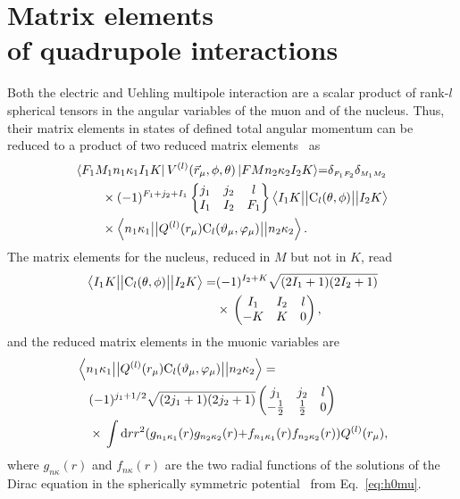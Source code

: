 \section{Matrix elements\\of quadrupole interactions}
\label{sec:mat}
Both the electric and Uehling multipole interaction are a scalar product of rank-$l$ spherical tensors in the angular variables of the muon and of the nucleus. Thus, their matrix elements in states of defined total angular momentum can be reduced to a product of two reduced matrix elements~\cite{varshalovich1988} as
\begin{align}
&{\left< F_1M_1n_1\kappa_1I_1K\right|V^{(l)}(\vec{r}_\mu,\phi,\theta)\left|FMn_2\kappa_2I_2K\right>} {=}
{\delta_{\scriptscriptstyle F_1F_2}\delta_{\scriptscriptstyle M_1M_2}}\notag\\
&\qquad\times(-1)^{F_1+j_2+I_1}
\left\{
\begin{matrix}
j_1&j_2&l\\
I_1&I_2&F_1
\end{matrix}
\right\}\left< I_1K\big{|}\big{|}\text{C}_l(\theta,\phi)\big{|}\big{|}I_2K\right>\notag\\
&\qquad\times \left< n_1\kappa_1\big{|}\big{|}Q^{(l)}(r_\mu)\text{C}_l(\vartheta_\mu,\varphi_\mu) \big{|}\big{|}n_2\kappa_2\right>.\label{eq:matel}
\end{align}
The matrix elements for the nucleus, reduced in $M$ but not in $K$, read~\cite{brown_carrington}
\begin{align}
\left< I_1K\big{|}\big{|}\text{C}_l(\theta,\phi)\big{|}\big{|}I_2K\right>=&(-1)^{I_2+K}
\sqrt{(2I_1+1)(2I_2+1)}\notag\\
&\times\,\left(
\begin{matrix}
I_1&I_2&l\\
-K&K&0
\end{matrix}
\right),
\end{align}
and the reduced matrix elements in the muonic variables are~\cite{johnson2007}
\begin{align}
&\left< n_1\kappa_1\big{|}\big{|}Q^{(l)}(r_\mu)\text{C}_l(\vartheta_\mu,\varphi_\mu) \big{|}\big{|}n_2\kappa_2\right> =  \\
&\quad (-1)^{j_1+1/2} \sqrt{(2j_1+1)(2j_2+1)}
\left(
\begin{matrix}
j_1&j_2&l\\
-\frac{1}{2}&\frac{1}{2}&0
\end{matrix}
\right)\notag\\
&\quad\times\,
\int \text{d}rr^2 ({g_{n_1\kappa_1}(r)g_{n_2\kappa_2}(r)}{+}{f_{n_1\kappa_1}(r)f_{n_2\kappa_2}(r)}) Q^{(l)}(r_\mu),\notag
\end{align}
where $g_{n\kappa}(r)$ and $f_{n\kappa}(r)$ are the two radial functions of the solutions of the Dirac equation in the spherically symmetric potential~\cite{greiner2000} from Eq.~\eqref{eq:h0mu}.






